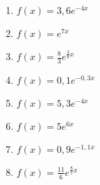 \begin{Exercise}
\begin{minipage}{\textwidth}
\begin{minipage}{0.5\textwidth}
\begin{enumerate}[label=\alph*)]
				\item \(f(x)=3,6e^{-4x}\)
				\item \(f(x)=e^{7x}\)
				\item \(f(x)=\frac{8}{3}e^{\frac{3}{8}x}\)
				\item \(f(x)=0,1e^{-0,3x}\)
				\item \(f(x)=5,3e^{-4x}\)
				\item \(f(x)=5e^{6x}\)
				\item \(f(x)=0,9e^{-1,1x}\)
				\item \(f(x)=\frac{11}{6}e^{\frac{8}{7}x}\)
			\end{enumerate}
		\end{minipage}%
	\end{minipage}%
\end{Exercise}
\newpage
